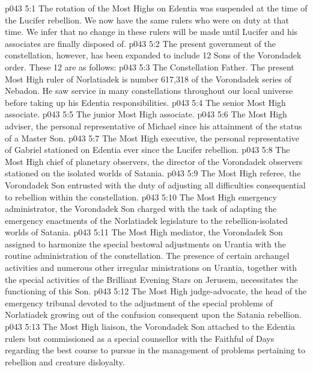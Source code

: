 \vs p043 5:1 The rotation of the Most Highs on Edentia was suspended at the time of the Lucifer rebellion. We now have the same rulers who were on duty at that time. We infer that no change in these rulers will be made until Lucifer and his associates are finally disposed of.
\vs p043 5:2 The present government of the constellation, however, has been expanded to include 12 Sons of the Vorondadek order. These 12 are as follows:
\vs p043 5:3 \bibnobreakspace The Constellation Father. The present Most High ruler of Norlatiadek is number 617,318 of the Vorondadek series of Nebadon. He saw service in many constellations throughout our local universe before taking up his Edentia responsibilities.
\vs p043 5:4 \bibnobreakspace The senior Most High associate.
\vs p043 5:5 \bibnobreakspace The junior Most High associate.
\vs p043 5:6 \bibnobreakspace The Most High adviser, the personal representative of Michael since his attainment of the status of a Master Son.
\vs p043 5:7 \bibnobreakspace The Most High executive, the personal representative of Gabriel stationed on Edentia ever since the Lucifer rebellion.
\vs p043 5:8 \bibnobreakspace The Most High chief of planetary observers, the director of the Vorondadek observers stationed on the isolated worlds of Satania.
\vs p043 5:9 \bibnobreakspace The Most High referee, the Vorondadek Son entrusted with the duty of adjusting all difficulties consequential to rebellion within the constellation.
\vs p043 5:10 \bibnobreakspace The Most High emergency administrator, the Vorondadek Son charged with the task of adapting the emergency enactments of the Norlatiadek legislature to the rebellion\hyp{}isolated worlds of Satania.
\vs p043 5:11 \bibnobreakspace The Most High mediator, the Vorondadek Son assigned to harmonize the special bestowal adjustments on Urantia with the routine administration of the constellation. The presence of certain archangel activities and numerous other irregular ministrations on Urantia, together with the special activities of the Brilliant Evening Stars on Jerusem, necessitates the functioning of this Son.
\vs p043 5:12 \bibnobreakspace The Most High judge\hyp{}advocate, the head of the emergency tribunal devoted to the adjustment of the special problems of Norlatiadek growing out of the confusion consequent upon the Satania rebellion.
\vs p043 5:13 \bibnobreakspace The Most High liaison, the Vorondadek Son attached to the Edentia rulers but commissioned as a special counsellor with the Faithful of Days regarding the best course to pursue in the management of problems pertaining to rebellion and creature disloyalty.
